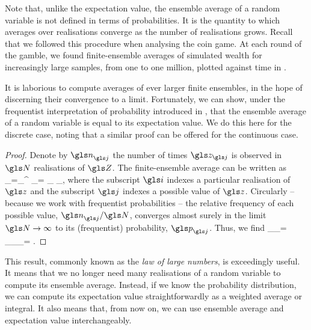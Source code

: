 Note that, unlike the expectation value, the ensemble average of a random variable is not defined in terms of probabilities. It is the quantity to which averages over realisations converge as the number of realisations grows. Recall that we followed this procedure when analysing the coin game. At each round of the gamble, we found finite-ensemble averages of simulated wealth for increasingly large samples, from one to one million, plotted against time in .

It is laborious to compute averages of ever larger finite ensembles, in the hope of discerning their convergence to a limit. Fortunately, we can show, under the frequentist interpretation of probability introduced in , that the ensemble average of a random variable is equal to its expectation value. We do this here for the discrete case, noting that a similar proof can be offered for the continuous case.
\begin{proof}
Denote by  $\gn_\gj$ the number of times $\z_\gj$ is observed in $\N$ realisations of $\Z$. The finite-ensemble average can be written as
\be
\ave{\Z}_\N =\sum_{}^{\N}  \z_\gi = \sum_\gj \frac{\gn_\gj}{\N} \z_\gj,
\ee
where the subscript $\gi$ indexes a particular realisation of $\z$ and the subscript $\gj$ indexes a possible value of $\z$. 
Circularly -- because we work with frequentist probabilities -- the relative frequency of each possible value, 
$\gn_\gj/\N$, converges almost surely in the limit $\N\to\infty$ to its (frequentist) probability, $\p_\gj$. Thus, we find
\be
\lim_{\N\to\infty}\ave{\Z}_\N = \sum_\gj \p_\gj \z_\gj = \eval{\Z}.
\ee
\end{proof}
This result, commonly known as the \textit{law of large numbers}, is exceedingly useful. It means that we no longer need many realisations of a random variable to compute its ensemble average. Instead, if we know the probability distribution, we can compute its expectation value straightforwardly as a weighted average or integral. It also means that, from now on, we can use ensemble average and expectation value interchangeably.

